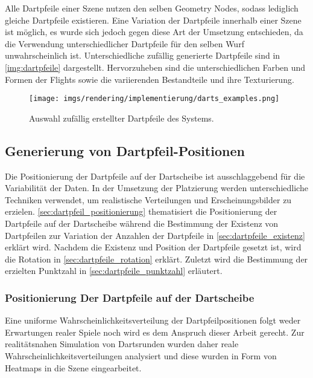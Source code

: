 \vspace{\baselineskip}

Alle Dartpfeile einer Szene nutzen den selben Geometry Nodes, sodass lediglich gleiche Dartpfeile existieren. Eine Variation der Dartpfeile innerhalb einer Szene ist möglich, es wurde sich jedoch gegen diese Art der Umsetzung entschieden, da die Verwendung unterschiedlicher Dartpfeile für den selben Wurf unwahrscheinlich ist. Unterschiedliche zufällig generierte Dartpfeile sind in \autoref{img:dartpfeile} dargestellt. Hervorzuheben sind die unterschiedlichen Farben und Formen der Flights sowie die variierenden Bestandteile und ihre Texturierung.

\begin{figure}
    \centering
    \texttt{[image: imgs/rendering/implementierung/darts\_examples.png]}
    \caption{Auswahl zufällig erstellter Dartpfeile des Systems.}
    \label{img:dartpfeile}
\end{figure}

\subsection{Generierung von Dartpfeil-Positionen}  %
\label{sec:wie_dartpfeil_positionen}

Die Positionierung der Dartpfeile auf der Dartscheibe ist ausschlaggebend für die Variabilität der Daten. In der Umsetzung der Platzierung werden unterschiedliche Techniken verwendet, um realistische Verteilungen und Erscheinungsbilder zu erzielen. \autoref{sec:dartpfeil_positionierung} thematisiert die Positionierung der Dartpfeile auf der Dartscheibe während die Bestimmung der Existenz von Dartpfeilen zur Variation der Anzahlen der Dartpfeile in \autoref{sec:dartpfeile_existenz} erklärt wird. Nachdem die Existenz und Position der Dartpfeile gesetzt ist, wird die Rotation in \autoref{sec:dartpfeile_rotation} erklärt. Zuletzt wird die Bestimmung der erzielten Punktzahl in \autoref{sec:dartpfeile_punktzahl} erläutert.

\subsubsection{Positionierung Der Dartpfeile auf der Dartscheibe}
\label{sec:dartpfeil_positionierung}

Eine uniforme Wahrscheinlichkeitsverteilung der Dartpfeilpositionen folgt weder Erwartungen realer Spiele noch wird es dem Anspruch dieser Arbeit gerecht. Zur realitätsnahen Simulation von Dartsrunden wurden daher reale Wahrscheinlichkeitsverteilungen analysiert und diese wurden in Form von Heatmaps in die Szene eingearbeitet.

